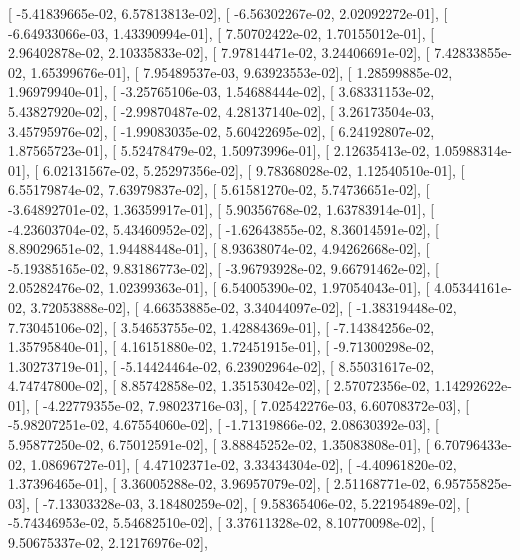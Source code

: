\documentclass{article}
\begin{document}
       [ -5.41839665e-02,   6.57813813e-02],
       [ -6.56302267e-02,   2.02092272e-01],
       [ -6.64933066e-03,   1.43390994e-01],
       [  7.50702422e-02,   1.70155012e-01],
       [  2.96402878e-02,   2.10335833e-02],
       [  7.97814471e-02,   3.24406691e-02],
       [  7.42833855e-02,   1.65399676e-01],
       [  7.95489537e-03,   9.63923553e-02],
       [  1.28599885e-02,   1.96979940e-01],
       [ -3.25765106e-03,   1.54688444e-02],
       [  3.68331153e-02,   5.43827920e-02],
       [ -2.99870487e-02,   4.28137140e-02],
       [  3.26173504e-03,   3.45795976e-02],
       [ -1.99083035e-02,   5.60422695e-02],
       [  6.24192807e-02,   1.87565723e-01],
       [  5.52478479e-02,   1.50973996e-01],
       [  2.12635413e-02,   1.05988314e-01],
       [  6.02131567e-02,   5.25297356e-02],
       [  9.78368028e-02,   1.12540510e-01],
       [  6.55179874e-02,   7.63979837e-02],
       [  5.61581270e-02,   5.74736651e-02],
       [ -3.64892701e-02,   1.36359917e-01],
       [  5.90356768e-02,   1.63783914e-01],
       [ -4.23603704e-02,   5.43460952e-02],
       [ -1.62643855e-02,   8.36014591e-02],
       [  8.89029651e-02,   1.94488448e-01],
       [  8.93638074e-02,   4.94262668e-02],
       [ -5.19385165e-02,   9.83186773e-02],
       [ -3.96793928e-02,   9.66791462e-02],
       [  2.05282476e-02,   1.02399363e-01],
       [  6.54005390e-02,   1.97054043e-01],
       [  4.05344161e-02,   3.72053888e-02],
       [  4.66353885e-02,   3.34044097e-02],
       [ -1.38319448e-02,   7.73045106e-02],
       [  3.54653755e-02,   1.42884369e-01],
       [ -7.14384256e-02,   1.35795840e-01],
       [  4.16151880e-02,   1.72451915e-01],
       [ -9.71300298e-02,   1.30273719e-01],
       [ -5.14424464e-02,   6.23902964e-02],
       [  8.55031617e-02,   4.74747800e-02],
       [  8.85742858e-02,   1.35153042e-02],
       [  2.57072356e-02,   1.14292622e-01],
       [ -4.22779355e-02,   7.98023716e-03],
       [  7.02542276e-03,   6.60708372e-03],
       [ -5.98207251e-02,   4.67554060e-02],
       [ -1.71319866e-02,   2.08630392e-03],
       [  5.95877250e-02,   6.75012591e-02],
       [  3.88845252e-02,   1.35083808e-01],
       [  6.70796433e-02,   1.08696727e-01],
       [  4.47102371e-02,   3.33434304e-02],
       [ -4.40961820e-02,   1.37396465e-01],
       [  3.36005288e-02,   3.96957079e-02],
       [  2.51168771e-02,   6.95755825e-03],
       [ -7.13303328e-03,   3.18480259e-02],
       [  9.58365406e-02,   5.22195489e-02],
       [ -5.74346953e-02,   5.54682510e-02],
       [  3.37611328e-02,   8.10770098e-02],
       [  9.50675337e-02,   2.12176976e-02],
\end{document}
